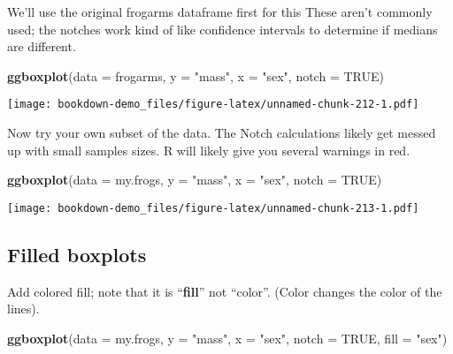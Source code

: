 \documentclass[]{book}
\newenvironment{Shaded}{\begin{snugshade}}{\end{snugshade}}
\newcommand{\KeywordTok}[1]{\textcolor[rgb]{0.13,0.29,0.53}{\textbf{#1}}}
\newcommand{\DataTypeTok}[1]{\textcolor[rgb]{0.13,0.29,0.53}{#1}}
\newcommand{\StringTok}[1]{\textcolor[rgb]{0.31,0.60,0.02}{#1}}
\newcommand{\OtherTok}[1]{\textcolor[rgb]{0.56,0.35,0.01}{#1}}
\newcommand{\NormalTok}[1]{#1}
\theoremstyle{definition}
\theoremstyle{definition}
\theoremstyle{definition}
\theoremstyle{remark}
\begin{document}
We'll use the original frogarms dataframe first for this These aren't
commonly used; the notches work kind of like confidence intervals to
determine if medians are different.

\begin{Shaded}
\begin{Highlighting}[]
\KeywordTok{ggboxplot}\NormalTok{(}\DataTypeTok{data =}\NormalTok{ frogarms,}
          \DataTypeTok{y =} \StringTok{"mass"}\NormalTok{,}
          \DataTypeTok{x =} \StringTok{"sex"}\NormalTok{,}
          \DataTypeTok{notch  =} \OtherTok{TRUE}\NormalTok{) }
\end{Highlighting}
\end{Shaded}

\texttt{[image: bookdown-demo\_files/figure-latex/unnamed-chunk-212-1.pdf]}

Now try your own subset of the data. The Notch calculations likely get
messed up with small samples sizes. R will likely give you several
warnings in red.

\begin{Shaded}
\begin{Highlighting}[]
\KeywordTok{ggboxplot}\NormalTok{(}\DataTypeTok{data =}\NormalTok{ my.frogs,}
          \DataTypeTok{y =} \StringTok{"mass"}\NormalTok{,}
          \DataTypeTok{x =} \StringTok{"sex"}\NormalTok{,}
          \DataTypeTok{notch  =} \OtherTok{TRUE}\NormalTok{)}
\end{Highlighting}
\end{Shaded}

\texttt{[image: bookdown-demo\_files/figure-latex/unnamed-chunk-213-1.pdf]}

\subsection{Filled boxplots}\label{filled-boxplots}

Add colored fill; note that it is ``\textbf{fill}'' not ``color''.
(Color changes the color of the lines).

\begin{Shaded}
\begin{Highlighting}[]
\KeywordTok{ggboxplot}\NormalTok{(}\DataTypeTok{data =}\NormalTok{ my.frogs,}
          \DataTypeTok{y =} \StringTok{"mass"}\NormalTok{,}
          \DataTypeTok{x =} \StringTok{"sex"}\NormalTok{,}
          \DataTypeTok{notch  =} \OtherTok{TRUE}\NormalTok{,}
          \DataTypeTok{fill =} \StringTok{"sex"}\NormalTok{)}
\end{Highlighting}
\end{Shaded}
\end{document}
